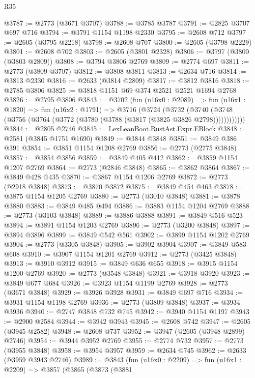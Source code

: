 \begin{lexlean}{R35}
\begin{coremodule}
@3787 := @2773 (@3671 @3707)
@3788 := @3785 @3787
@3791 := @2825 @3707 @697 @716
@3794 := @3791 @1154 @1198 @2330
@3795 := @2608 @712
@3797 := @2605 (@3795 @2218)
@3798 := @2608 @707
@3800 := @2605 (@3798 @2229)
@3801 := @2608 @702
@3803 := @2605 (@3801 @2328)
@3806 := @3797 (@3800 (@3803 @2809))
@3808 := @3794 @3806 @2769
@3809 := @2774 @697
@3811 := @2773 (@3809 @3707)
@3812 := @3808 @3811
@3813 := @2634 @716
@3814 := @3813 @2330
@3816 := @2633 (@3814 @2809)
@3817 := @3812 @3816
@3818 := @2785 @3806
@3825 := @3818 @1151 @69 @374 @2521 @2521 @1694 @2768
@3826 := @2795 @3806
@3843 := @3702
    (fun (u16x0 : @2089) =>
    fun (u16x1 : @1820) =>
    fun (u16x2 : @1791) =>
    @3716
      (@3724
        (@3732
          (@3740 (@3748 (@3756 (@3764 (@3772 (@3780 (@3788 (@3817 (@3825 @3826 @2798))))))))))))
@3844 := @2805 @2746
@3845 := LexLeanBoot.RustAst.Expr.EBlock
@3848 := @2581 (@3845 @1751 @1690)
@3849 := @3844 @3848
@3851 := @3849 @386 @391
@3854 := @3851 @1154 @1208 @2769
@3856 := @2773 (@2775 @3848)
@3857 := @3854 @3856
@3859 := @3849 @405 @412
@3862 := @3859 @1154 @1207 @2769
@3864 := @2773 (@2846 @3848)
@3865 := @3862 @3864
@3867 := @3849 @428 @435
@3870 := @3867 @1154 @1206 @2769
@3872 := @2773 (@2918 @3848)
@3873 := @3870 @3872
@3875 := @3849 @454 @463
@3878 := @3875 @1154 @1205 @2769
@3880 := @2773 (@3010 @3848)
@3881 := @3878 @3880
@3883 := @3849 @485 @494
@3886 := @3883 @1154 @1204 @2769
@3888 := @2773 (@3103 @3848)
@3889 := @3886 @3888
@3891 := @3849 @516 @523
@3894 := @3891 @1154 @1203 @2769
@3896 := @2773 (@3200 @3848)
@3897 := @3894 @3896
@3899 := @3849 @542 @561
@3902 := @3899 @1154 @1202 @2769
@3904 := @2773 (@3305 @3848)
@3905 := @3902 @3904
@3907 := @3849 @583 @608
@3910 := @3907 @1154 @1201 @2769
@3912 := @2773 (@3425 @3848)
@3913 := @3910 @3912
@3915 := @3849 @636 @655
@3918 := @3915 @1154 @1200 @2769
@3920 := @2773 (@3548 @3848)
@3921 := @3918 @3920
@3923 := @3849 @677 @684
@3926 := @3923 @1154 @1199 @2769
@3928 := @2773 (@3671 @3848)
@3929 := @3926 @3928
@3931 := @3849 @697 @716
@3934 := @3931 @1154 @1198 @2769
@3936 := @2773 (@3809 @3848)
@3937 := @3934 @3936
@3940 := @2747 @3848 @732 @745
@3942 := @3940 @1154 @1197
@3943 := @2900 @2584
@3944 := @3942 @3943
@3945 := @2608 @742
@3947 := @2605 (@3945 @2582)
@3948 := @2608 @737
@3952 := @3947 (@2605 (@3948 @2899) @2746)
@3954 := @3944 @3952 @2769
@3955 := @2774 @732
@3957 := @2773 (@3955 @3848)
@3958 := @3954 @3957
@3959 := @2634 @745
@3962 := @2633 (@3959 @3943 @2746)
@3989 := @3843
    (fun (u16x0 : @2209) =>
    fun (u16x1 : @2209) =>
    @3857
      (@3865
        (@3873
          (@3881

\end{coremodule}
\end{lexlean}
